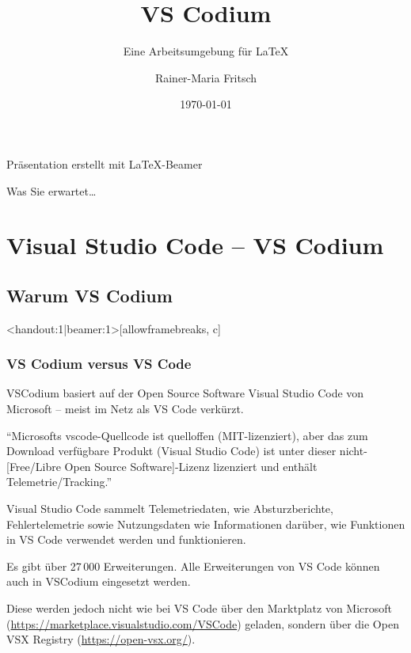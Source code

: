 \documentclass[t, %
							xcolor=dvipsnames,%
							hyperref={bookmarks,colorlinks},%
							]%
							{beamer}
\title[Kurzer Titel]{VS Codium}
\subtitle[]{Eine Arbeitsumgebung für \LaTeX}
\author[RMF]{\small{Rainer-Maria Fritsch}}
\date[\today]{\today}
\begin{document}
	\begin{frame}{}
		\maketitle
		\begin{center} 
			\tiny{Präsentation erstellt mit {\LaTeX}-Beamer} 
		\end{center}
		
	\end{frame}
	
	\begin{frame}{Was Sie erwartet\ldots}
		\setcounter{tocdepth}{1}
		\tableofcontents
	\end{frame}
	
	\AtBeginSection[]{
		\begin{frame}
		\setcounter{tocdepth}{2}
		\tableofcontents[currentsection]
    \end{frame}
	}
  
  \section{Visual Studio Code -- VS Codium}
  \label{sec:VisualStudioCode}
		\subsection{Warum VS Codium}
			\label{sub:WarumVSCodium}
			\begin{frame}<handout:1|beamer:1>[allowframebreaks, c]
				\frametitle{VS Codium versus VS Code}
				VSCodium basiert auf der Open Source Software Visual Studio Code von Microsoft -- meist im Netz als VS Code verkürzt.\cite{microsoft} 

				\enquote{Microsofts vscode-Quellcode ist quelloffen (MIT-lizenziert), aber das zum Download verfügbare Produkt (Visual Studio Code) ist unter dieser nicht-[Free/Libre Open Source Software]-Lizenz lizenziert und enthält Telemetrie/Tracking.}
				
				Visual Studio Code sammelt Telemetriedaten, wie Absturzberichte, Fehlertelemetrie sowie Nutzungsdaten wie Informationen darüber, wie Funktionen in VS Code verwendet werden und funktionieren. \cite{vscodium}

				\framebreak
				Es gibt über 27\,000 Erweiterungen. Alle Erweiterungen von VS Code können auch in VSCodium eingesetzt werden. 
				
				Diese werden jedoch nicht wie bei VS Code über den Marktplatz von Microsoft (\url{https://marketplace.visualstudio.com/VSCode}) geladen, sondern über die Open VSX Registry (\url{https://open-vsx.org/}). 
			\end{frame}
\end{document}
